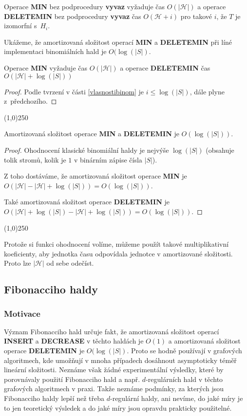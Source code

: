 \documentclass[a4paper,12pt]{article}
\newenvironment{myproof}{
  \begin{proof}
    
  }{
  \end{proof}
  \begin{center}
   \line(1,0){250}
   \end{center}
  }
\begin{document}
\begin{pozorovani}
    Ope\-ra\-ce {\bf MIN}
    bez podprocedury {\bf vyvaz} vyžaduje čas $O(|\mathcal H|)$ a operace 
    {\bf DELETEMIN} bez podprocedury {\bf vyvaz }čas $O(\mathcal H+i)$ pro 
    takové $i$, že $T$ je izomorfní s~$H_i$.
\end{pozorovani}

Ukážeme, že amortizovaná složitost operací {\bf MIN} a {\bf DELETEMIN }
při líné implementaci binomiálních hald je $O(\log
(|S|)$. 
\begin{lemma}
    Ope\-ra\-ce {\bf MIN} vyžaduje čas $O(|\mathcal H|)$ a ope\-race 
    {\bf DELETEMIN }čas $O(|\mathcal H|+\log(|S|))$
\end{lemma}
\begin{myproof}
    Podle tvrzení v části \ref{vlasnostibinom} je $i\le\log(|S|)$, dále plyne z~předchozího.
\end{myproof}

\begin{veta}
    Amortizovaná složitost ope\-race {\bf MIN} a {\bf DELETEMIN} je $O(\log(|S|))$.
\end{veta}
\begin{myproof}

Ohodnocení klasické binomiální haldy je nejvýše $\log
(|S|)$ 
(obsahuje tolik stromů, kolik je $1$ v binárním zápise 
čísla $|S|$).

Z toho dostáváme, že amortizovaná složitost ope\-race {\bf MIN} je 
$O(|\mathcal H|-|\mathcal H|+\log(|S|))=O(\log(|S|))$.

Také amortizovaná složitost 
operace {\bf DELETEMIN} je $O(|\mathcal H|+\log(|S|)-|\mathcal H|+\log(|S
|))=O(\log(|S|))$.
\end{myproof}

Protože si funkci ohodnocení volíme, 
můžeme použít takové multiplikativní 
koeficienty, aby jednotka času odpovídala jednotce v 
amortizované složitosti. Proto lze $|\mathcal H|$ od sebe odečíst.

\subsection{Fibonacciho haldy}

\subsubsection{Motivace}

Význam Fibonacciho hald určuje fakt, že amortizovaná 
složitost operací {\bf INSERT} a {\bf DECREASE} v těchto haldách je 
$O(1)$ a amortizovaná složitost operace {\bf DELETEMIN} je $
O(\log(|S|)$. 
Proto se hodně používají v grafových algoritmech, 
kde umožňují v mnoha případech dosáhnout asymptoticky téměř lineární 
složitosti. Neznáme však žádné  
expe\-rimentální výsledky, které by porovnávaly použití Fibonacciho 
hald a např. $d$-regulárních hald v těchto grafových 
algoritmech v praxi. Takže neznáme podmínky, za 
kterých jsou Fibonacciho 
haldy lepší než třeba $d$-regulární haldy, 
ani nevíme, do jaké míry je to jen teoretický 
výsledek a do jaké míry jsou opravdu prakticky použitelné. 
\end{document}
